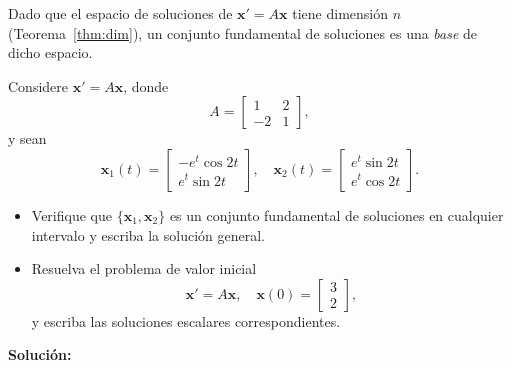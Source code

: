 \begin{remark}
Dado que el espacio de soluciones de $\mathbf{x}' = A\mathbf{x}$ tiene dimensi\'on $n$ (Teorema~\ref{thm:dim}), un conjunto fundamental de soluciones es una \textit{base} de dicho espacio.
\end{remark}

\begin{example}\label{ex:espiral}
Considere $\mathbf{x}' = A\mathbf{x}$, donde
\[
A = \begin{bmatrix} 1 & 2 \\ -2 & 1 \end{bmatrix},
\]
y sean
\[
\mathbf{x}_1(t) = \begin{bmatrix} -e^t \cos 2t \\ e^t \sin 2t \end{bmatrix}, \quad \mathbf{x}_2(t) = \begin{bmatrix} e^t \sin 2t \\ e^t \cos 2t \end{bmatrix}.
\]
\begin{itemize}
    \item[\textbf{(a)}] Verifique que $\{\mathbf{x}_1, \mathbf{x}_2\}$ es un conjunto fundamental de soluciones en cualquier intervalo y escriba la soluci\'on general.
    \item[\textbf{(b)}] Resuelva el problema de valor inicial
    \[
    \mathbf{x}' = A\mathbf{x}, \quad \mathbf{x}(0) = \begin{bmatrix} 3 \\ 2 \end{bmatrix},
    \]
    y escriba las soluciones escalares correspondientes.
\end{itemize}

\textbf{Soluci\'on:}


\end{example}
